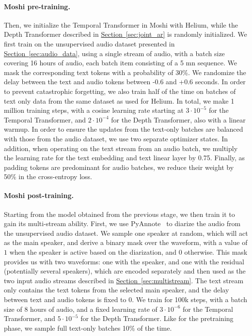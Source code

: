 \paragraph{Moshi pre-training.}
Then, we initialize the Temporal Transformer in Moshi with Helium, while the Depth Transformer described in \hyperref[sec:joint_ar]{Section~\ref{sec:joint_ar}} is randomly initialized. 
We first train on the unsupervised audio dataset presented in \hyperref[sec:audio_data]{Section~\ref{sec:audio_data}}, using a single stream of audio, with a batch size covering 16 hours of audio, each batch item consisting of a 5 mn sequence. We mask the corresponding text tokens with a probability of 30\%. We randomize the delay between the text and audio tokens between -0.6 and +0.6 seconds.
In order to prevent catastrophic forgetting, we also train half of the time on batches of text only data from the same dataset as used for Helium. In total, we make 1 million training steps, with a cosine learning rate starting at $3\cdot 10^{-5}$ for the Temporal Transformer, and $2\cdot 10^{-4}$ for the Depth Transformer, also with a linear warmup. In order to ensure the updates from the text-only batches are balanced with those from the audio dataset, we use two separate optimizer states. In addition, when operating on the text stream from an audio batch, we multiply the learning rate for the text embedding and text linear layer by 0.75. Finally, as padding tokens are predominant for audio batches, we reduce their weight by 50\% in the cross-entropy loss.

\paragraph{Moshi post-training.}
Starting from the model obtained from the previous stage, we then train it to gain its multi-stream ability. First, we use PyAnnote~\citep{Bredin23} to diarize the audio from the unsupervised audio dataset. We sample one speaker at random, which will act as the main speaker, and derive a binary mask over the waveform, with a value of $1$ when the speaker is active based on the diarization, and $0$ otherwise. This mask provides us with two waveforms: one with the speaker, and one with the residual (potentially several speakers), which are encoded separately and then used as the two input audio streams described in \hyperref[sec:multistream]{Section~\ref{sec:multistream}}. The text stream only contains the text tokens from the selected main speaker, and the delay between text and audio tokens is fixed to 0. We train for 100k steps, with a batch size of 8 hours of audio, and a fixed learning rate of $3\cdot 10^{-6}$ for the Temporal Transformer, and $5\cdot 10^{-5}$ for the Depth Transformer. Like for the pretraining phase, we sample full text-only batches 10\% of the time.


